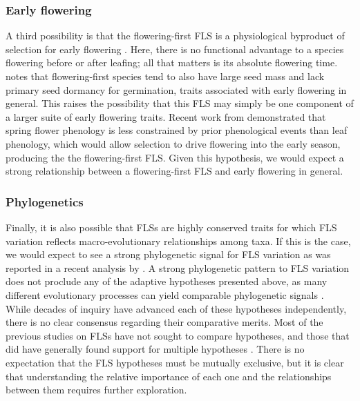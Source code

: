 \documentclass{article}
\begin{document}
\subsubsection*{Early flowering}
\noindent A third possibility is that the flowering-first FLS is a physiological byproduct of selection for early flowering \citep{Primack1987}. Here, there is no functional advantage to a species flowering before or after leafing; all that matters is its absolute flowering time. \citet{Primack1987} notes that flowering-first species tend to also have large seed mass and lack primary seed dormancy for germination, traits associated with early flowering in general. This raises the possibility that this FLS may simply be one component of a larger suite of early flowering traits. Recent work from \citet{Savage2019} demonstrated that spring flower phenology is less constrained by prior phenological events than leaf phenology, which would allow selection to drive flowering into the early season, producing the the flowering-first FLS. Given this hypothesis, we would expect a strong relationship between a flowering-first FLS and early flowering in general.

\subsubsection*{Phylogenetics} 
\noindent Finally, it is also possible that FLSs are highly conserved traits for which FLS variation reflects macro-evolutionary relationships among taxa. If this is the case, we would expect to see a strong phylogenetic signal for FLS variation as was reported in a recent analysis by \citet{Gougherty2018}. A strong phylogenetic pattern to FLS variation does not proclude any of the adaptive hypotheses presented above, as  many different evolutionary processes can yield comparable phylogenetic signals \citep{Revell2008}. \\

\noindent While decades of inquiry have advanced each of these hypotheses independently, there is no clear consensus regarding their comparative merits. Most of the previous studies on FLSs have not sought to compare hypotheses, and those that did have generally found support for multiple hypotheses \citep[see][]{Bolmgren2003,Gougherty2018}. There is no expectation that the FLS hypotheses must be mutually exclusive, but it is clear that understanding the relative importance of each one and the relationships between them requires further exploration.\\
\end{document}
